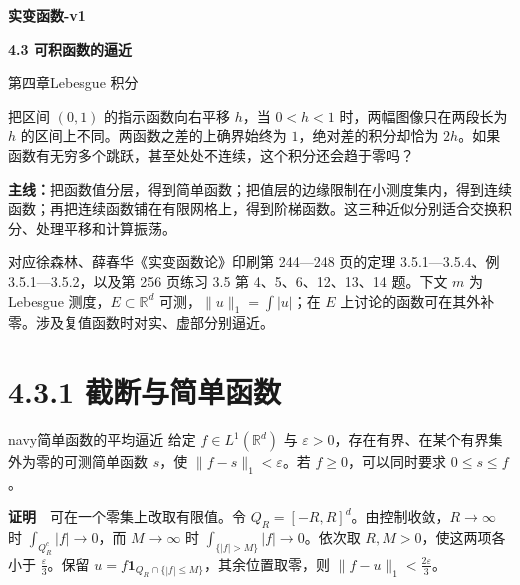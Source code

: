 \documentclass[11pt,a4paper]{article}
\begin{document}
\begin{center}{\LARGE\bfseries 实变函数-v1\par}\vspace{7pt}
{\Large\bfseries 4.3 可积函数的逼近\par}\vspace{6pt}
{第四章\quad Lebesgue 积分\par}\end{center}
把区间 \((0,1)\) 的指示函数向右平移 \(h\)，当 \(0<h<1\)
时，两幅图像只在两段长为 \(h\) 的区间上不同。两函数之差的上确界始终为
\(1\)，绝对差的积分却恰为
\(2h\)。如果函数有无穷多个跳跃，甚至处处不连续，这个积分还会趋于零吗？
\par\textbf{主线：}把函数值分层，得到简单函数；把值层的边缘限制在小测度集内，得到连续函数；再把连续函数铺在有限网格上，得到阶梯函数。这三种近似分别适合交换积分、处理平移和计算振荡。
\begin{center}
\end{center}
对应徐森林、薛春华《实变函数论》印刷第 244---248 页的定理
3.5.1---3.5.4、例 3.5.1---3.5.2，以及第 256 页练习 3.5 第
4、5、6、12、13、14 题。下文 \(m\) 为 Lebesgue
测度，\(E\subset\mathbb R^d\) 可测，\(\|u\|_1=\int |u|\)；在 \(E\)
上讨论的函数可在其外补零。涉及复值函数时对实、虚部分别逼近。
\begingroup\small\setlength{\parskip}{0pt}\tableofcontents\endgroup
\newpage
{}\section[\S{}4.3.1
截断与简单函数]{4.3.1
截断与简单函数}\label{ux622aux65adux4e0eux7b80ux5355ux51fdux6570}

\begin{sboxenv}{navy}{简单函数的平均逼近}
给定 \(f\in L^1(\mathbb R^d)\) 与
\(\varepsilon>0\)，存在有界、在某个有界集外为零的可测简单函数 \(s\)，使
\(\|f-s\|_1<\varepsilon\)。若 \(f\ge0\)，可以同时要求 \(0\le s\le f\)。

\end{sboxenv}

\textbf{证明}　可在一个零集上改取有限值。令
\(Q_R=[-R,R]^d\)。由控制收敛，\(R\to\infty\) 时
\(\int_{Q_R^c}|f|\to0\)，而 \(M\to\infty\) 时
\(\int_{\{|f|>M\}}|f|\to0\)。依次取 \(R,M>0\)，使这两项各小于
\(\frac{\varepsilon}{3}\)。保留
\(u=f\mathbf1_{Q_R\cap\{|f|\le M\}}\)，其余位置取零，则
\(\|f-u\|_1<\frac{2\varepsilon}{3}\)。
\end{document}
